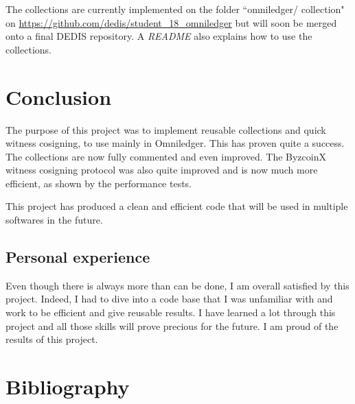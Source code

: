 \documentclass[11pt, a4paper, twoside, openright]{article}
\begin{document}
The collections are currently implemented on the folder ``omniledger/ collection" on \url{https://github.com/dedis/student_18_omniledger} but will soon be merged onto a final DEDIS repository. A \textit{README} also explains how to use the collections.

\section{Conclusion}
The purpose of this project was to implement reusable collections and quick witness cosigning, to use mainly in Omniledger. This has proven quite a success. The collections are now fully commented and even improved. The ByzcoinX witness cosigning protocol was also quite improved and is now much more efficient, as shown by the performance tests. 

This project has produced a clean and efficient code that will be used in multiple softwares in the future.

\subsection{Personal experience}
Even though there is always more than can be done, I am overall satisfied by this project. Indeed, I had to dive into a code base that I was unfamiliar with and work to be efficient and give reusable results. I have learned a lot through this project and all those skills will prove precious for the future. I am proud of the results of this project.

\section{Bibliography}


\end{document}
